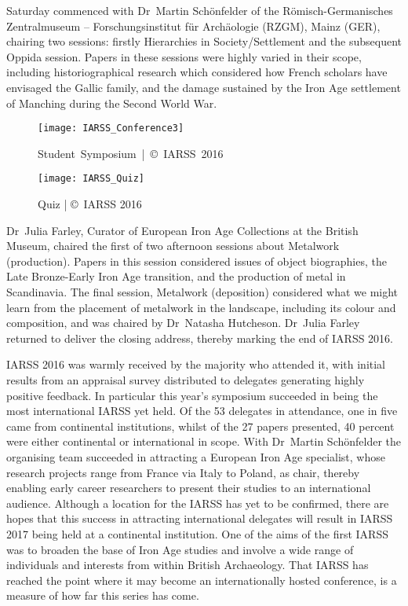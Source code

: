 Saturday commenced with Dr~Martin Schönfelder of the \foreignlanguage{ngerman}{Römisch\--German\-isches Zentralmuseum --
 Forschungsinstitut für Archäologie} (RZGM), Mainz (GER), chairing two sessions: firstly Hierarchies in
  Society/Settlement and the subsequent Oppida session. Papers in these sessions were highly varied in
   their scope, including historiographical research which considered how French scholars have envisaged
    the Gallic family, and the damage sustained by the Iron Age settlement of Manching during the Second World War. 
\begin{wrapfigure}{O}[.05\textwidth]{0.6\linewidth}
\texttt{[image: IARSS\_Conference3]}
\caption{\mbox{Student Symposium |  \copyright\ IARSS 2016}}
\label{fig:IARSS_Conference3}
\texttt{[image: IARSS\_Quiz]}
\caption{Quiz | \copyright\ IARSS 2016}
\label{fig:IARSS_Quiz}
\end{wrapfigure} 
Dr~Julia Farley, Curator of European Iron Age Collections at the British Museum, chaired the first of two afternoon sessions about Metalwork (production).  Papers in this session considered issues of object biographies, the Late Bronze-Early Iron Age transition, and the production of metal in Scandinavia. 
The final session, Metalwork (deposition) considered what we might learn from the placement of metalwork in the landscape, including its colour and composition, and was chaired by Dr~Natasha Hutcheson. 
Dr~Julia Farley returned to deliver the closing address, thereby marking the end of IARSS 2016.


IARSS 2016 was warmly received by the majority who attended it, with initial results from an appraisal survey distributed to delegates generating highly positive feedback. In particular this year’s symposium succeeded in being the most international IARSS yet held. 
Of the 53 delegates in attendance, one in five came from continental institutions, whilst of the 27 papers presented, 40 percent were either continental or international in scope. With Dr~Martin Schönfelder the organising team succeeded in attracting a European Iron Age specialist, whose research projects range from France via Italy to Poland, as chair, thereby enabling early career researchers to present their studies to an international audience. Although a location for the  IARSS has yet to be confirmed, there are hopes that this success in attracting international delegates will result in IARSS 2017 being held at a continental institution. One of the aims of the first IARSS was to broaden the base of Iron Age studies and involve a wide range of individuals and interests from within British Archaeology. 
That IARSS has reached the point where it may become an internationally hosted conference, is a measure of how far this series has come.
\enlargethispage{3\baselineskip}

